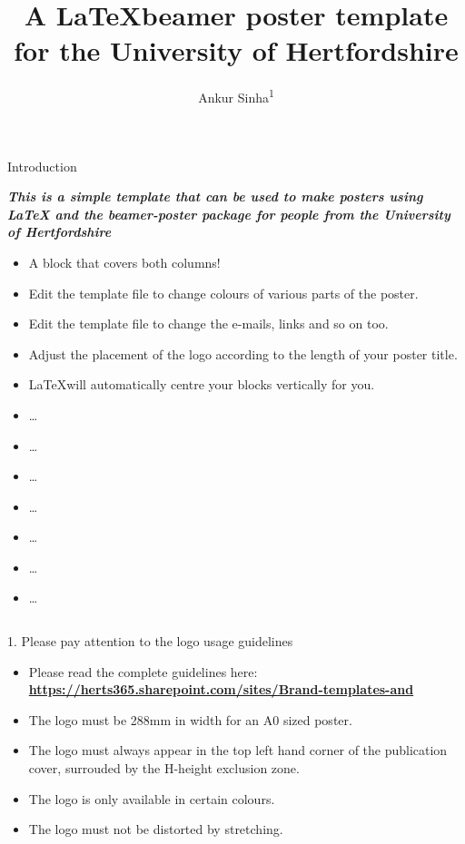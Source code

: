\documentclass[final]{beamer}
\title[UH poster]{\Huge A \LaTeX beamer poster template for the University of Hertfordshire}
\author[Sinha]{Ankur Sinha\textsuperscript{1}}
\institute[UH]{\textsuperscript{1}University of Hertfordshire, UK}
\begin{document}
\begin{frame}{} 
  \begin{block}{Introduction}
    \begin{center}
      \emph{\textbf{This is a simple template that can be used to make posters using LaTeX and the beamer-poster package for people from the University of Hertfordshire}}
      \begin{itemize}
        \item A block that covers both columns!
        \item Edit the template file to change colours of various parts of the poster.
        \item Edit the template file to change the e-mails, links and so on too.
        \item Adjust the placement of the logo according to the length of your poster title.
        \item \LaTeX will automatically centre your blocks vertically for you.
        \item \ldots
        \item \ldots
        \item \ldots
        \item \ldots
        \item \ldots
        \item \ldots
        \item \ldots
      \end{itemize}
    \end{center}
  \end{block}
  \begin{columns}
    \begin{column}{0.49\textwidth}
      \begin{block}{1. Please pay attention to the logo usage guidelines}
        \begin{itemize}
          \item Please read the complete guidelines here: \textbf{\href{https://herts365.sharepoint.com/sites/Brand-templates-and-communications/SitePages/Brand.aspx}{https://herts365.sharepoint.com/sites/Brand-templates-and}}
          \item The logo must be \alert{288mm} in width for an A0 sized poster.
          \item The logo must always appear in the \alert{top left hand corner} of the publication cover, surrouded by the H-height exclusion zone.
          \item The logo is only available in certain colours.
          \item The logo must not be distorted by stretching.

\end{itemize}
\end{block}
\end{column}
\end{columns}
\end{frame}
\end{document}
